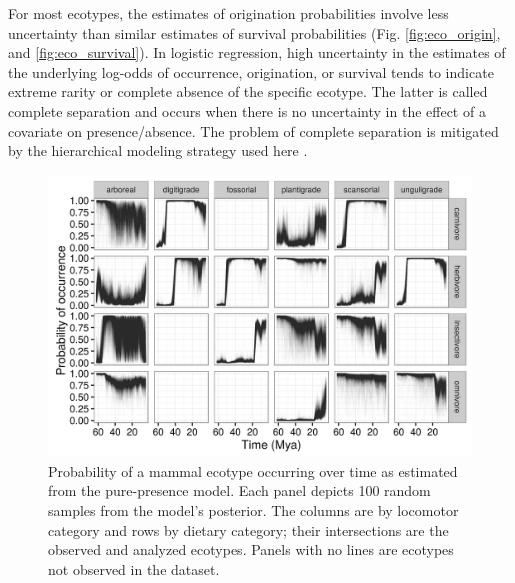 \documentclass[12pt,letterpaper]{article}
\begin{document}
For most ecotypes, the estimates of origination probabilities involve less uncertainty than similar estimates of survival probabilities (Fig. \ref{fig:eco_origin}, and \ref{fig:eco_survival}). In logistic regression, high uncertainty in the estimates of the underlying log-odds of occurrence, origination, or survival tends to indicate extreme rarity or complete absence of the specific ecotype. The latter is called complete separation and occurs when there is no uncertainty in the effect of a covariate on presence/absence. The problem of complete separation is mitigated by the hierarchical modeling strategy used here \citep{Gelman2013d,Gelman2007,McElreath2016}.


\begin{figure}[ht]
  \centering
  \includegraphics[width=\textwidth,height=0.4\textheight,keepaspectratio=true]{figure/ecotype_occurrence}
  \caption[Ecotype occurrence probability estimated from the pure-presence model]{Probability of a mammal ecotype occurring over time as estimated from the pure-presence model. Each panel depicts 100 random samples from the model's posterior. The columns are by locomotor category and rows by dietary category; their intersections are the observed and analyzed ecotypes. Panels with no lines are ecotypes not observed in the dataset.}
  \label{fig:eco_occur}
\end{figure}
\end{document}
